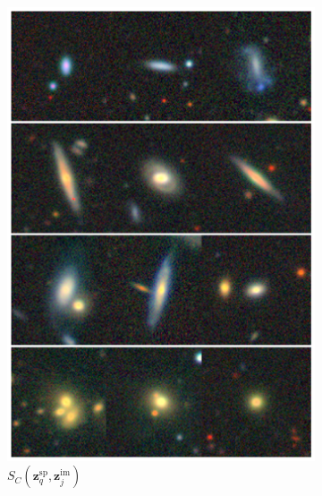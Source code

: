 \documentclass[draft, a4paper,12pt]{article}
\begin{document}
\begin{figure}[H]
\begin{subfigure}{0.22\textwidth}
        \includegraphics[height=0.21\textheight]{../figures/images_im_sp.png}
        \caption{$S_C(\mathbf{z}_q^{\text{sp}}, \mathbf{z}_j^{\text{im}})$}
        \label{fig:retrieval_4}
    \end{subfigure}%
    \hfill
    \begin{subfigure}{0.22\textwidth}
        \centering

\end{subfigure}
\end{figure}
\end{document}
